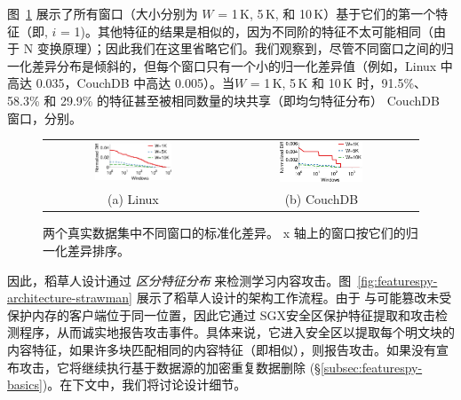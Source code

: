 图~\ref{fig:featurespy-featureDistribution} 展示了所有窗口（大小分别为 $W$ = 1\,K, 5\,K, 和 10\,K）基于它们的第一个特征（即, $i$ = 1)。其他特征的结果是相似的，因为不同阶的特征不太可能相同（由于 N 变换原理）；因此我们在这里省略它们。我们观察到，尽管不同窗口之间的归一化差异分布是倾斜的，但每个窗口只有一个小的归一化差异值（例如，Linux 中高达 0.035，CouchDB 中高达 0.005）。当$W$ = 1\,K, 5\,K 和 10\,K 时，91.5\%、58.3\% 和 29.9\% 的特征甚至被相同数量的块共享（即均匀特征分布） CouchDB 窗口，分别。

\begin{figure}
  \centering
  \begin{tabular}{cc}
    \includegraphics[width=0.45\textwidth]{pic/featurespy/plot/featureDistribution/featureDistributionLinux.pdf} &
    \includegraphics[width=0.45\textwidth]{pic/featurespy/plot/featureDistribution/featureDistributionCouchbase.pdf} \\
    {\small (a) Linux} & {\small (b) CouchDB} \\
    \end{tabular}
  \vspace{-6pt}
  \caption{两个真实数据集中不同窗口的标准化差异。 x 轴上的窗口按它们的归一化差异排序。}
  \label{fig:featurespy-featureDistribution}
  \vspace{-6pt}
\end{figure}

因此，稻草人设计通过 {\em 区分特征分布} 来检测学习内容攻击。图~\ref{fig:featurespy-architecture-strawman} 展示了稻草人设计的架构工作流程。由于 \sysnameF 与可能篡改未受保护内存的客户端位于同一位置，因此它通过 SGX安全区保护特征提取和攻击检测程序，从而诚实地报告攻击事件。具体来说，它进入安全区以提取每个明文块的内容特征，如果许多块匹配相同的内容特征（即相似），则报告攻击。如果没有宣布攻击，它将继续执行基于数据源的加密重复数据删除 (\S\ref{subsec:featurespy-basics})。在下文中，我们将讨论设计细节。


